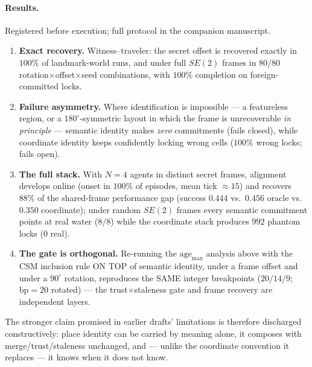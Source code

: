 \documentclass{article}
\begin{document}
\paragraph{Results.} Registered before execution; full protocol in
the companion manuscript.
\begin{enumerate}[leftmargin=20pt,itemsep=2pt,topsep=2pt]
\item \textbf{Exact recovery.} Witness--traveler: the secret offset is
  recovered exactly in $100\%$ of landmark-world runs, and under full
  $SE(2)$ frames in $80/80$ rotation$\times$offset$\times$seed
  combinations, with $100\%$ completion on foreign-committed locks.
\item \textbf{Failure asymmetry.} Where identification is impossible
  --- a featureless region, or a $180^\circ$-symmetric layout in which
  the frame is unrecoverable \emph{in principle} --- semantic identity
  makes \emph{zero} commitments (fails closed), while coordinate
  identity keeps confidently locking wrong cells ($100\%$ wrong locks;
  fails open).
\item \textbf{The full stack.} With $N{=}4$ agents in distinct secret
  frames, alignment develops online (onset in $100\%$ of episodes,
  mean tick ${\approx}15$) and recovers $88\%$ of the shared-frame
  performance gap (success $0.444$ vs.\ $0.456$ oracle vs.\ $0.350$
  coordinate); under random $SE(2)$ frames every semantic commitment
  points at real water ($8/8$) while the coordinate stack produces
  $992$ phantom locks ($0$ real).
\item \textbf{The gate is orthogonal.} Re-running the
  $\mathrm{age}_{\max}$ analysis above with the CSM inclusion rule ON
  TOP of semantic identity, under a frame offset and under a
  $90^\circ$ rotation, reproduces the SAME integer breakpoints
  ($20/14/9$; $\mathrm{bp}=20$ rotated) --- the trust$\times$staleness
  gate and frame recovery are independent layers.
\end{enumerate}

The stronger claim promised in earlier drafts' limitations is
therefore discharged constructively: place identity can be carried by
meaning alone, it composes with merge/trust/staleness unchanged, and
--- unlike the coordinate convention it replaces --- it knows when it
does not know.
\end{document}
